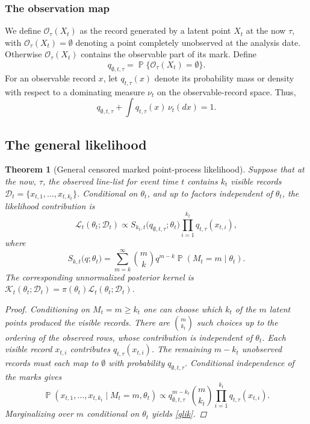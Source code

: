 \documentclass{article}
\newtheorem{theorem}{Theorem}
\theoremstyle{definition}
\theoremstyle{remark}
\newcommand{\Prb}{\operatorname{\mathbb{P}}}
\begin{document}
\subsubsection{The observation map}

We define $\mathcal{O}_{\tau}(X_t)$ as the record generated by a latent point $X_t$ at the now $\tau$, with $\mathcal{O}_{\tau}(X_t)=\emptyset$ denoting a point completely unobserved at the analysis date. Otherwise $\mathcal{O}_{\tau}(X_t)$ contains the observable part of its mark. Define
\begin{equation}
    q_{\emptyset,t,\tau}=\Prb\{\mathcal{O}_{\tau}(X_t)=\emptyset\}.
\end{equation}
For an observable record $x$, let $q_{t,\tau}(x)$ denote its probability mass or density with respect to a dominating measure $\nu_t$ on the observable-record space. Thus,
\begin{equation}
    q_{\emptyset,t,\tau}
    + \int q_{t,\tau}(x)\,\nu_t(dx)
    =1.
\end{equation}
\subsection{The general likelihood}

\begin{theorem}[General censored marked point-process likelihood] 
Suppose that at the now, $\tau$, the observed line-list for event time $t$ contains $k_t$ visible records $\mathcal D_t=\{x_{t,1},\ldots,x_{t,k_t}\}$. Conditional on $\theta_t$, and up to factors independent of $\theta_t$, the likelihood contribution is
\begin{equation}\label{glik}
    \mathcal{L}_t(\theta_t;\mathcal D_t) 
    \propto 
    S_{k_t,t}\big(q_{\emptyset, t, \tau};\theta_t\big) 
    \prod\limits_{i = 1}^{k_t} q_{t,\tau}(x_{t,i}),
\end{equation}
where
\begin{equation}
    S_{k,t}\big(q;\theta_t\big) = \sum\limits_{m=k}^{\infty} \binom{m}{k} q^{m-k} \Prb(M_t = m\mid\theta_t).
\end{equation}
The corresponding unnormalized posterior kernel is $\mathcal K_t(\theta_t;\mathcal D_t)=\pi(\theta_t)\mathcal L_t(\theta_t;\mathcal D_t)$.
\begin{proof}
Conditioning on $M_t=m\geq k_t$ one can choose which $k_t$ of the $m$ latent points produced the visible records. There are $\binom{m}{k_t}$ such choices up to the ordering of the observed rows, whose contribution is independent of $\theta_t$. Each visible record $x_{t,i}$ contributes $q_{t,\tau}(x_{t,i})$. The remaining $m-k_t$ unobserved records must each map to $\emptyset$ with probability $q_{\emptyset, t, \tau}$. Conditional independence of the marks gives
\begin{equation}
    \Prb(x_{t,1},\dots,x_{t,k_t}\mid M_t=m,\theta_t)
    \propto    
    q_{\emptyset,t,\tau}^{m-k_t} \binom{m}{k_t}
    \prod_{i=1}^{k_t}q_{t,\tau}(x_{t,i}).
\end{equation}
Marginalizing over $m$ conditional on $\theta_t$ yields \eqref{glik}.
\end{proof}
\end{theorem}
\end{document}
